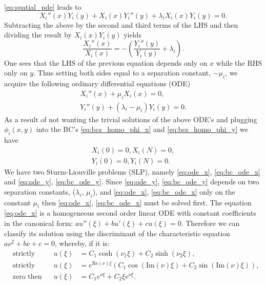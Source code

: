 \documentclass[\main/thesis.tex]{subfiles}
\begin{document}
\eqref{eq:spatial_pde} leads to
\begin{equation*}
X_i''(x)Y_i(y) {+} X_i(x)Y_i''(y) {+} \lambda_i X_i(x)Y_i(y) {=} 0.
\end{equation*} 
Subtracting the above by the second and third terms of the LHS and then dividing the result by $X_i(x)Y_i(y)$ yields
\begin{equation*}
\frac{X_i''(x)}{X_i(x)} {=} {-}\left(\frac{Y_i''(y)}{Y_i(y)} {+} \lambda_i \right).
\end{equation*}
One sees that the LHS of the previous equation depends only on $x$ while the RHS only on $y$. Thus setting both sides equal to a separation constant, $\minus \mu_i$, we acquire the following ordinary 
differential equations (ODE)
\begin{align}
X_i''(x) {+} \mu_i X_i(x) {=} 0,
\label{eq:ode_x} \\
Y_i''(y) {+} (\lambda_i {-} \mu_i)Y_i(y) {=} 0.
\label{eq:ode_y}
\end{align}
As a result of not wanting the trivial solutions of the above ODE's and plugging $\phi_i(x, y)$ into the BC's \eqref{eq:bcs_homo_phi_x} and \eqref{eq:bcs_homo_phi_y} we have
\begin{align}
X_i(0) {=} 0, X_i(N) {=} 0,
\label{eq:bc_ode_x}\\
Y_i(0) {=} 0, Y_i(N) {=} 0.
\label{eq:bc_ode_y}
\end{align} 
We have two Sturm-Liouville problems (SLP), namely \eqref{eq:ode_x}, \eqref{eq:bc_ode_x} and \eqref{eq:ode_y}, \eqref{eq:bc_ode_y}. Since \eqref{eq:ode_y}, \eqref{eq:bc_ode_y} depends on two separation 
constants, ($\lambda_i$, $\mu_i$), and \eqref{eq:ode_x}, \eqref{eq:bc_ode_x} only on the constant $\mu_i$ then \eqref{eq:ode_x}, \eqref{eq:bc_ode_x} must be solved first. The equation \eqref{eq:ode_x} is 
a homogeneous second order linear ODE with constant coefficients in the canonical form: $au''(\xi) {+} bu'(\xi) {+} cu(\xi) {=} 0$. Therefore we can classify its solution using the discriminant of the 
characteristic equation $a\nu^2 {+} b\nu {+} c {=} 0$, whereby, if it is:
\begin{align*}
&\text{strictly positive then } &u(\xi) &{=} C_1\cosh(\nu_1\xi) {+} C_2\sinh(\nu_2\xi),\\
&\text{strictly negative then } &u(\xi) &{=} e^{\text{Re}(\nu) \xi}(C_1\cos(\text{Im}(\nu) \xi) {+} C_2\sin(\text{Im}(\nu) \xi)),\\
&\text{zero then } &u(\xi) &{=} C_1 e^{\nu \xi} + C_2\xi e^{\nu \xi}.
\end{align*}
\end{document}
